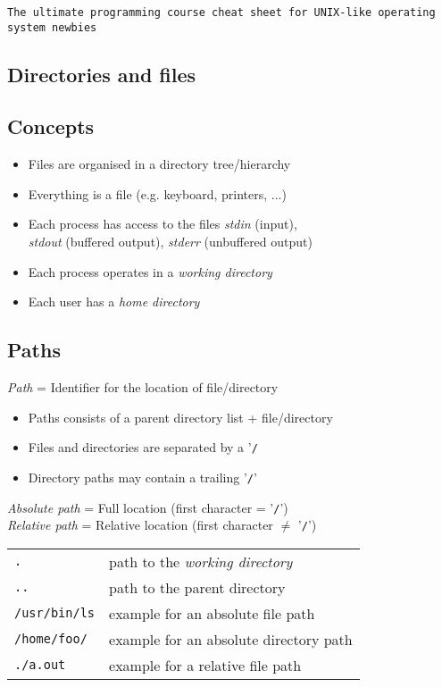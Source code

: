 \documentclass[landscape, a4paper]{article}
\newcommand{\cl}[1]{\texttt{#1}}
\begin{document}
\begin{center}	\cl{The ultimate programming course cheat sheet for UNIX-like operating system newbies}
\end{center}
\begin{multicols*}{3}
\section*{\centering Directories and files}
\subsection*{Concepts}
\begin{itemize}
	\item Files are organised in a directory tree/hierarchy
	\item Everything is a file (e.g. keyboard, printers, ...)
	\item Each process has access to the files \textit{stdin} (input),\\
		  \textit{stdout} (buffered output), \textit{stderr} (unbuffered output)
	\item Each process operates in a \textit{working directory}
	\item Each user has a \textit{home directory}
\end{itemize}
\subsection*{Paths}
\textit{Path} = Identifier for the location of file/directory
\begin{itemize}
	\item Paths consists of a parent directory list + file/directory
	\item Files and directories are separated by a '\cl{/}
	\item Directory paths may contain a trailing '\cl{/}'
\end{itemize}
\textit{Absolute path} = Full location (first character = '\cl{/}')\\
\textit{Relative path} = Relative location (first character $\neq$ '\cl{/}')\\

\begin{tabular}{ll}
\cl{.} 				& path to the \textit{working directory}\\
\cl{..} 			& path to the parent directory\\
\cl{/usr/bin/ls}	& example for an absolute file path\\
\cl{/home/foo/} 	& example for an absolute directory path\\
\cl{./a.out} 		& example for a relative file path\\
\end{tabular}

\end{multicols*}
\end{document}
